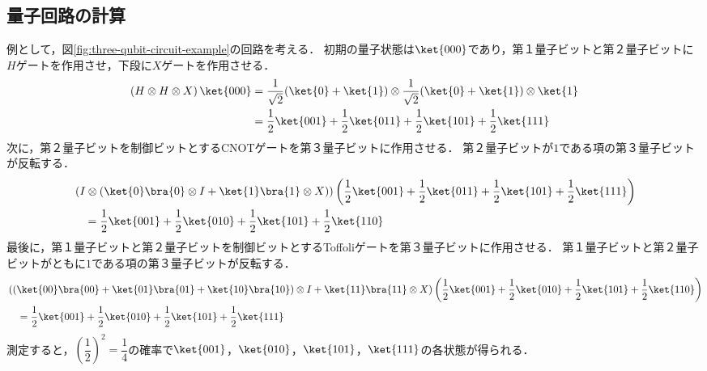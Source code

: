 \subsection{量子回路の計算}
例として，図\ref{fig:three-qubit-circuit-example}の回路を考える．
初期の量子状態は$\ket{000}$であり，第１量子ビットと第２量子ビットに$H$ゲートを作用させ，下段に$X$ゲートを作用させる．
\begin{align*}
    \left(H \otimes H \otimes X\right)\ket{000}
     & = \frac{1}{\sqrt{2}}(\ket{0}+\ket{1}) \otimes \frac{1}{\sqrt{2}}(\ket{0}+\ket{1}) \otimes \ket{1} \\
     & = \frac{1}{2}\ket{001} + \frac{1}{2}\ket{011} + \frac{1}{2}\ket{101} + \frac{1}{2}\ket{111}
\end{align*}
次に，第２量子ビットを制御ビットとするCNOTゲートを第３量子ビットに作用させる．
第２量子ビットが$1$である項の第３量子ビットが反転する．
\begin{align*}
     & \left(I \otimes \left( \ket{0}\bra{0} \otimes I + \ket{1}\bra{1} \otimes X \right)\right)
    \left(\frac{1}{2}\ket{001} + \frac{1}{2}\ket{011} + \frac{1}{2}\ket{101} + \frac{1}{2}\ket{111}\right) \\
     & \quad= \frac{1}{2}\ket{001} + \frac{1}{2}\ket{010} + \frac{1}{2}\ket{101} + \frac{1}{2}\ket{110}
\end{align*}
最後に，第１量子ビットと第２量子ビットを制御ビットとするToffoliゲートを第３量子ビットに作用させる．
第１量子ビットと第２量子ビットがともに$1$である項の第３量子ビットが反転する．
\begin{align*}
     & \left(\left( \ket{00}\bra{00}+\ket{01}\bra{01}+\ket{10}\bra{10}\right)\otimes I + \ket{11}\bra{11}\otimes X\right)
    \left(\frac{1}{2}\ket{001} + \frac{1}{2}\ket{010} + \frac{1}{2}\ket{101} + \frac{1}{2}\ket{110}\right)                \\
     & \quad= \frac{1}{2}\ket{001} + \frac{1}{2}\ket{010} + \frac{1}{2}\ket{101} + \frac{1}{2}\ket{111}
\end{align*}
測定すると，$\left(\dfrac{1}{2}\right)^2 = \dfrac{1}{4}$の確率で$\ket{001}$，$\ket{010}$，$\ket{101}$，$\ket{111}$の各状態が得られる．

